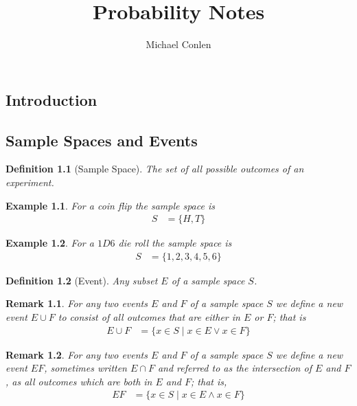 \documentclass[11pt, oneside]{book}   	%
\title{Probability Notes}
\author{Michael Conlen}
\newtheorem{definition}{Definition}[chapter]
\newtheorem{example}{Example}[chapter]
\newtheorem{remark}{Remark}[chapter]
\begin{document}
\begin{spacing}{1.618}
\frontmatter
\maketitle
\tableofcontents
\setcounter{tocdepth}{4}

\mainmatter
\chapter{Introduction}
\section{Sample Spaces and Events}
\begin{definition}[Sample Space]
	The set of all possible outcomes of an experiment. 
\end{definition}

\begin{example}
	For a coin flip the \emph{sample space} is 
	\begin{alignat}{4}
		S&=\{H, T\}
	\end{alignat}
\end{example}
\begin{example}
	For a $1D6$ die roll the \emph{sample space} is
	\begin{alignat}{4}
		S&=\{1, 2, 3, 4, 5, 6\}
	\end{alignat}
\end{example}

\begin{definition}[Event]
	Any subset $E$ of a sample space $S$.
\end{definition}

\begin{remark}
	For any two events $E$ and $F$ of a sample space $S$ we define a new event $E\cup F$ to consist of all outcomes that are either in $E$ or $F$; that is
	\begin{alignat}{4}
		E\cup F&=\{x\in S\mid x\in E \vee x\in F\}
	\end{alignat}
\end{remark}

\begin{remark}
	For any two events $E$ and $F$ of a sample space $S$ we define a new event $EF$, sometimes written $E\cap F$ and referred to as the intersection of $E$ and $F$, as all outcomes which are both in $E$ and $F$; that is, 
	\begin{alignat}{4}
		EF&=\{x\in S\mid x\in E \wedge x\in F\}
	\end{alignat}
\end{remark}


\end{spacing}
\end{document}
